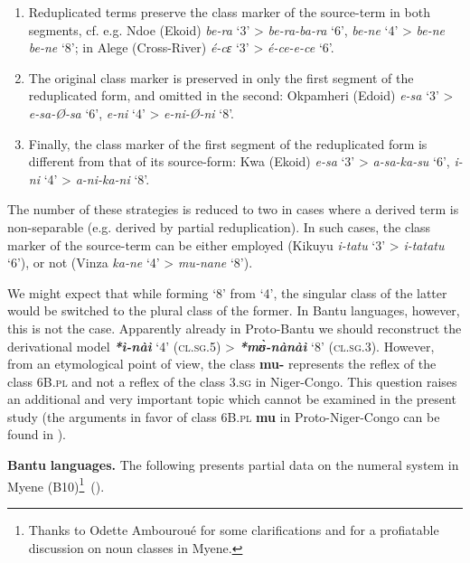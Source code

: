 \begin{enumerate}
\item Reduplicated terms preserve the class marker of the source-term in both segments, cf. e.g. Ndoe (Ekoid) \textit{be-ra} ‘3’ > \textit{be-ra-ba-ra} ‘6’, \textit{be-ne} ‘4’ > \textit{be-ne} \textit{be-ne} ‘8’; in Alege (Cross-River) \textit{{\'{e}}-cɛ} ‘3’ > \textit{{\'{e}}-ce-e-ce} `6'.
\item The original class marker is preserved in only the first segment of the reduplicated form, and omitted in the second: Okpamheri (Edoid) \textit{e-sa} ‘3’ > \textit{e-sa-Ø-sa} ‘6’, \textit{e-ni} ‘4’ > \textit{e-ni-Ø-ni} ‘8’.
\item Finally, the class marker of the first segment of the reduplicated form is different from that of its source-form: Kwa (Ekoid) \textit{e-sa} ‘3’ > \textit{a-sa-ka-su} ‘6’, \textit{i-ni} ‘4’ > \textit{a-ni-ka-ni} ‘8’.
\end{enumerate}
The number of these strategies is reduced to two in cases where a derived term is non-separable (e.g. derived by partial reduplication). In such cases, the class marker of the source-term can be either employed (Kikuyu \textit{i-tatu} ‘3’  >  \textit{i-tatatu} ‘6’), or not (Vinza \textit{ka-}\textit{ne} ‘4’ > \textit{mu-}\textit{nane} ‘8’). 

We might expect that while forming ‘8’ from ‘4’, the singular class of the latter would be switched to the plural class of the former. In Bantu languages, however, this is not the case. Apparently already in Proto-Bantu we should reconstruct the derivational model  \textbf{\textit{*ì-n{\`{a}}ì}} ‘4’ (\textsc{cl}.\textsc{sg}.5) > \textbf{\textit{*m{\`{ʊ}}-n{\`{a}}n{\`{a}}ì}} ‘8’ (\textsc{cl}.\textsc{sg}.3). However, from an etymological point of view, the class \textbf{mu-} represents the reflex of the class 6B.\textsc{pl} and not a reflex of the class 3.\textsc{sg} in Niger-Congo. This question raises an additional and very important topic which cannot be examined in the present study (the arguments in favor of class 6B.\textsc{pl}  \textbf{mu} in Proto-Niger-Congo can be found in \citealt{Pozdniakov2013}). 

\textbf{Bantu} \textbf{languages.} The following presents partial data on the numeral system in Myene (B10)\footnote{Thanks to Odette Ambouroué for some clarifications and for a profiatable discussion on noun classes in Myene.}~().




